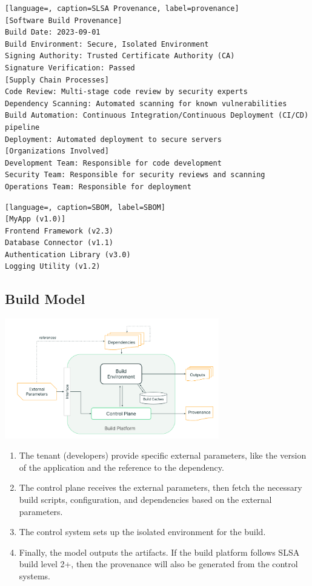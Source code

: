 \begin{lstlisting}[language=, caption=SLSA Provenance, label=provenance]
[Software Build Provenance]
Build Date: 2023-09-01
Build Environment: Secure, Isolated Environment
Signing Authority: Trusted Certificate Authority (CA)
Signature Verification: Passed
[Supply Chain Processes]
Code Review: Multi-stage code review by security experts
Dependency Scanning: Automated scanning for known vulnerabilities
Build Automation: Continuous Integration/Continuous Deployment (CI/CD) pipeline
Deployment: Automated deployment to secure servers
[Organizations Involved]
Development Team: Responsible for code development
Security Team: Responsible for security reviews and scanning
Operations Team: Responsible for deployment
\end{lstlisting}

\begin{lstlisting}[language=, caption=SBOM, label=SBOM]
[MyApp (v1.0)]
Frontend Framework (v2.3)
Database Connector (v1.1)
Authentication Library (v3.0)
Logging Utility (v1.2)
\end{lstlisting}

\subsection{Build Model}
\includegraphics[width=0.7\textwidth]{./screenshot/build_model.png}
\begin{enumerate}
  \item The tenant (developers) provide specific external parameters, like the version of the application 
  and the reference to the dependency.
  \item The control plane receives the external parameters, then fetch the necessary build scripts, configuration,  
  and dependencies based on the external parameters.
  \item The control system sets up the isolated environment for the build.
  \item Finally, the model outputs the artifacts. If the build platform follows SLSA build level 2+, then
  the provenance will also be generated from the control systems.
\end{enumerate}

